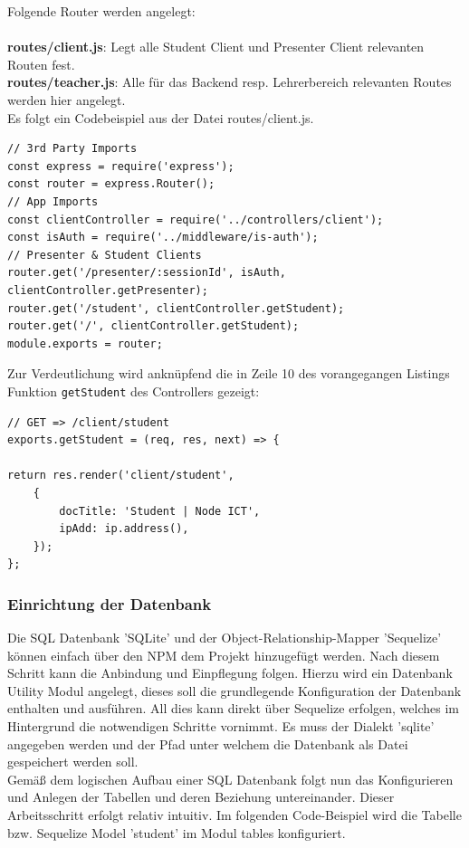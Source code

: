 Folgende Router werden angelegt: \\ \\
\textbf{routes/client.js}: Legt alle Student Client und Presenter Client relevanten Routen fest.\\
\textbf{routes/teacher.js}: Alle für das Backend resp. Lehrerbereich relevanten Routes werden hier angelegt.\\
Es folgt ein Codebeispiel aus der Datei routes/client.js. 
\begin{lstlisting}[caption=Unterrouten und Controlleranbindung]
// 3rd Party Imports
const express = require('express');
const router = express.Router();
// App Imports
const clientController = require('../controllers/client');
const isAuth = require('../middleware/is-auth');
// Presenter & Student Clients
router.get('/presenter/:sessionId', isAuth, clientController.getPresenter);
router.get('/student', clientController.getStudent);
router.get('/', clientController.getStudent);
module.exports = router;
\end{lstlisting}
Zur Verdeutlichung wird anknüpfend die in Zeile 10 des vorangegangen Listings Funktion \texttt{getStudent} des Controllers gezeigt:
\begin{lstlisting}[caption=GET Funktion des Student Controllers]
// GET => /client/student
exports.getStudent = (req, res, next) => {

return res.render('client/student',
	{
		docTitle: 'Student | Node ICT',
		ipAdd: ip.address(),
	});
};
\end{lstlisting}
 
 \subsubsection{Einrichtung der Datenbank}
 Die SQL Datenbank 'SQLite'  und der Object-Relationship-Mapper 'Sequelize' können einfach über den NPM dem Projekt hinzugefügt werden.  
 Nach diesem Schritt kann die Anbindung und Einpflegung folgen. Hierzu wird ein Datenbank Utility Modul angelegt, dieses soll die grundlegende Konfiguration der Datenbank enthalten und ausführen. All dies kann direkt über Sequelize erfolgen, welches im Hintergrund die notwendigen Schritte vornimmt. Es muss der Dialekt 'sqlite' angegeben werden und der Pfad unter welchem die Datenbank als Datei gespeichert werden soll. \\ 
 Gemäß dem logischen Aufbau einer SQL Datenbank folgt nun das Konfigurieren und Anlegen der Tabellen und deren Beziehung untereinander. Dieser Arbeitsschritt erfolgt relativ intuitiv. Im folgenden Code-Beispiel wird die Tabelle bzw. Sequelize Model 'student' im Modul tables konfiguriert.
 
